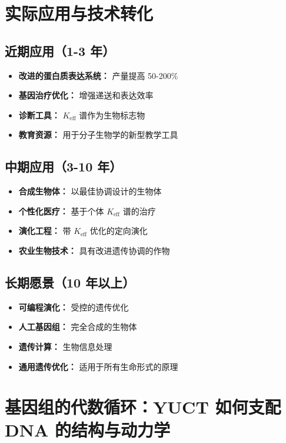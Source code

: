 \documentclass[12pt]{article}
\begin{document}
	\section{实际应用与技术转化}
	
	\subsection{近期应用（1-3 年）}
	
	\begin{itemize}
		\item \textbf{改进的蛋白质表达系统：} 产量提高 50-200\%
		\item \textbf{基因治疗优化：} 增强递送和表达效率
		\item \textbf{诊断工具：} $K_{\text{eff}}$ 谱作为生物标志物
		\item \textbf{教育资源：} 用于分子生物学的新型教学工具
	\end{itemize}
	
	\subsection{中期应用（3-10 年）}
	
	\begin{itemize}
		\item \textbf{合成生物体：} 以最佳协调设计的生物体
		\item \textbf{个性化医疗：} 基于个体 $K_{\text{eff}}$ 谱的治疗
		\item \textbf{演化工程：} 带 $K_{\text{eff}}$ 优化的定向演化
		\item \textbf{农业生物技术：} 具有改进遗传协调的作物
	\end{itemize}
	
	\subsection{长期愿景（10 年以上）}
	
	\begin{itemize}
		\item \textbf{可编程演化：} 受控的遗传优化
		\item \textbf{人工基因组：} 完全合成的生物体
		\item \textbf{遗传计算：} 生物信息处理
		\item \textbf{通用遗传优化：} 适用于所有生命形式的原理
	\end{itemize}
	
	\section{基因组的代数循环：YUCT 如何支配 DNA 的结构与动力学}
	\label{sec:genetic-loops}
	
\end{document}
